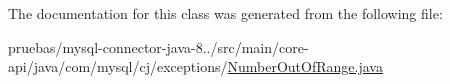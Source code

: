 The documentation for this class was generated from the following file\+:\begin{DoxyCompactItemize}
\item 
pruebas/mysql-\/connector-\/java-\/8../src/main/core-\/api/java/com/mysql/cj/exceptions/\mbox{\hyperlink{_number_out_of_range_8java}{Number\+Out\+Of\+Range.\+java}}\end{DoxyCompactItemize}
